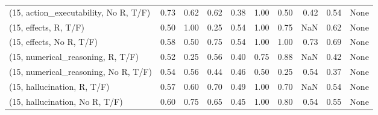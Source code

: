 \begin{table*}[h!]
\begin{adjustbox}{width=2\columnwidth,center}
\begin{tabular}{lrrr|rrr|rrr}
(15, action\_executability, No R, T/F) &                      0.73 &                  0.62 &                      0.62 &                          0.38 &                      1.00 &                          0.50 &                                   0.42 &                               0.54 &                                  None \\
(15, effects, R, T/F)                 &                      0.50 &                  1.00 &                      0.25 &                          0.54 &                      1.00 &                          0.75 &                                    NaN &                               0.62 &                                  None \\
(15, effects, No R, T/F)              &                      0.58 &                  0.50 &                      0.75 &                          0.54 &                      1.00 &                          1.00 &                                   0.73 &                               0.69 &                                  None \\
(15, numerical\_reasoning, R, T/F)     &                      0.52 &                  0.25 &                      0.56 &                          0.40 &                      0.75 &                          0.88 &                                    NaN &                               0.42 &                                  None \\
(15, numerical\_reasoning, No R, T/F)  &                      0.54 &                  0.56 &                      0.44 &                          0.46 &                      0.50 &                          0.25 &                                   0.54 &                               0.37 &                                  None \\
(15, hallucination, R, T/F)           &                      0.57 &                  0.60 &                      0.70 &                          0.49 &                      1.00 &                          0.70 &                                    NaN &                               0.54 &                                  None \\
(15, hallucination, No R, T/F)        &                      0.60 &                  0.75 &                      0.65 &                          0.45 &                      1.00 &                          0.80 &                                   0.54 &                               0.55 &                                  None \\

\end{tabular}
\end{adjustbox}
\end{table*}
